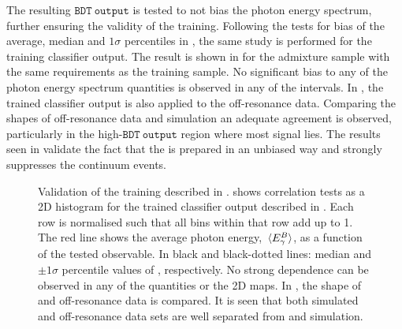 The resulting $\mathtt{BDT~output}$ is tested to not bias the photon energy spectrum, further ensuring the validity of the training.
Following the tests for bias of the average, median and $1\sigma$ percentiles in ,
the same study is performed for the training classifier output.
The result is shown in  for the \BtoXsgamma admixture sample with the same requirements as the training sample.
No significant bias to any of the photon energy spectrum quantities is observed in any of the intervals.
In , the trained classifier output is also applied to the off-resonance data.
Comparing the shapes of off-resonance data and simulation an adequate agreement is observed, particularly in the high-$\mathtt{BDT~output}$ region where most signal lies.
The results seen in  validate the fact that the \BDT is prepared in an unbiased way and strongly suppresses the continuum events.
\begin{figure}[htbp!]
    \centering
    \caption{\label{fig:bdt_validation} 
    Validation of the training described in .
     shows correlation tests as a 2D histogram for the trained classifier output described in .
    Each row is normalised such that all bins within that row add up to 1.
    The red line shows  the average photon energy, $\expval**{{E^B_{\gamma}}}$, as a function of the tested observable.
    In black and black-dotted lines: median and $\pm 1 \sigma$ percentile values of \EB, respectively.
    No strong dependence can be observed in any of the quantities or the 2D maps.
    In , the shape of \epem\ra\qqbar and off-resonance data is compared.
    It is seen that both simulated and off-resonance data sets are well separated from \BB and \BtoXsgamma simulation.
    }
\end{figure}